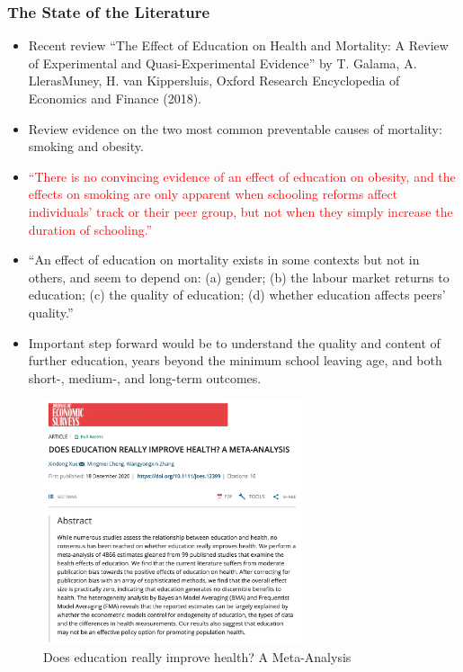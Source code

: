             

\subsubsection{The State of the Literature}  
\begin{itemize}
    \item Recent review “The Effect of Education on Health and Mortality: A Review of Experimental and Quasi-Experimental Evidence” by T. Galama, A. LlerasMuney, H. van Kippersluis, Oxford Research Encyclopedia of Economics and Finance (2018).
    \item Review evidence on the two most common preventable causes of mortality: smoking and obesity.
    \item \textcolor{red}{“There is no convincing evidence of an effect of education on obesity, and the effects on smoking are only apparent when schooling reforms affect individuals’ track or their peer group, but not when they simply increase the duration of schooling.”}
    \item “An effect of education on mortality exists in some contexts but not in others, and seem to depend on: (a) gender; (b) the labour market returns to education; (c) the quality of education; (d) whether education affects peers’ quality.”
    \item Important step forward would be to understand the quality and content of further education, years beyond the minimum school leaving age, and both short-, medium-, and long-term outcomes.
\end{itemize}

\begin{figure}[H]%
                \centering
                \includegraphics[width=3in]{images/ch3/49.png}
                \caption {Does education really improve health? A Meta-Analysis}
                \label{fig:label}
            \end{figure}

